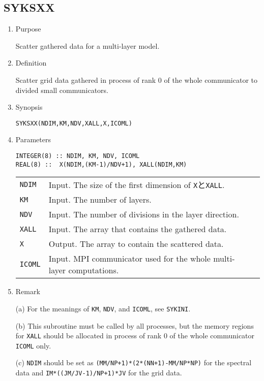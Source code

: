 \documentclass[a4paper]{scrartcl}
\begin{document}
\subsection{SYKSXX}

\begin{enumerate}

\item Purpose

Scatter gathered data for a multi-layer model.  

\item Definition

Scatter grid data gathered in process of rank 0
of the whole communicator to divided small communicators.  

\item Synopsis 

\texttt{SYKSXX(NDIM,KM,NDV,XALL,X,ICOML)}
  
\item Parameters

\begin{verbatim}        
INTEGER(8) :: NDIM, KM, NDV, ICOML
REAL(8) ::  X(NDIM,(KM-1)/NDV+1), XALL(NDIM,KM)
\end{verbatim}

\begin{tabular}{lll}
\texttt{NDIM} & Input. The size of the first dimension of
\texttt{X}と\texttt{XALL}.\\
\texttt{KM} & Input. The number of layers.\\
\texttt{NDV} & Input. The number of divisions in the layer direction.\\  
\texttt{XALL} & Input.
The array that contains the gathered data.\\
\texttt{X} & Output. The array to contain the scattered data.\\
\texttt{ICOML} & Input. MPI communicator used for the whole
multi-layer computations.
\end{tabular}


\item Remark

(a) For the meanings of
  \texttt{KM}, \texttt{NDV}, and \texttt{ICOML}, see
  \texttt{SYKINI}.

(b) This subroutine must be called by all processes, but
the memory regions for \texttt{XALL}
should be allocated in process of rank 0 of
the whole communicator \texttt{ICOML} only.

(c) \texttt{NDIM} should be set as
\texttt{(MM/NP+1)*(2*(NN+1)-MM/NP*NP)} for the
spectral data and
\texttt{IM*((JM/JV-1)/NP+1)*JV} for the grid data.


\end{enumerate}
\end{document}
